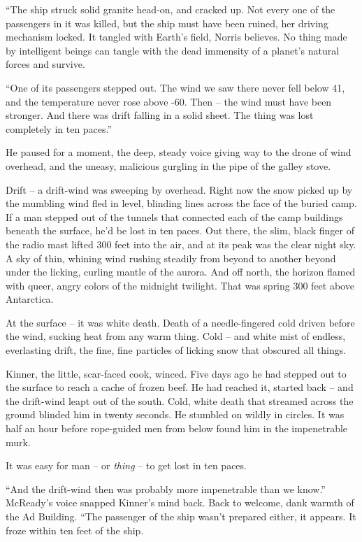 \documentclass[ebook,oneside,11pt]{memoir}				%
\begin{document}
``The ship struck solid granite head-on, and cracked up. Not every one of the passengers in it was killed, but the ship must have been ruined, her driving mechanism locked. It tangled with Earth's field, Norris believes. No thing made by intelligent beings can tangle with the dead immensity of a planet's natural forces and survive.

``One of its passengers stepped out. The wind we saw there never fell below 41, and the temperature never rose above -60. Then -- the wind must have been stronger. And there was drift falling in a solid sheet. The thing was lost completely in ten paces.''

He paused for a moment, the deep, steady voice giving way to the drone of wind overhead, and the uneasy, malicious gurgling in the pipe of the galley stove.

Drift -- a drift-wind was sweeping by overhead. Right now the snow picked up by the mumbling wind fled in level, blinding lines across the face of the buried camp. If a man stepped out of the tunnels that connected each of the camp buildings beneath the surface, he'd be lost in ten paces. Out there, the slim, black finger of the radio mast lifted 300 feet into the air, and at its peak was the clear night sky. A sky of thin, whining wind rushing steadily from beyond to another beyond under the licking, curling mantle of the aurora. And off north, the horizon flamed with queer, angry colors of the midnight twilight. That was spring 300 feet above Antarctica.

At the surface -- it was white death. Death of a needle-fingered cold driven before the wind, sucking heat from any warm thing. Cold -- and white mist of endless, everlasting drift, the fine, fine particles of licking snow that obscured all things.

Kinner, the little, scar-faced cook, winced. Five days ago he had stepped out to the surface to reach a cache of frozen beef. He had reached it, started back -- and the drift-wind leapt out of the south. Cold, white death that streamed across the ground blinded him in twenty seconds. He stumbled on wildly in circles. It was half an hour before rope-guided men from below found him in the impenetrable murk.

It was easy for man -- or \emph{thing} -- to get lost in ten paces.

``And the drift-wind then was probably more impenetrable than we know.'' McReady's voice snapped Kinner's mind back. Back to welcome, dank warmth of the Ad Building. ``The passenger of the ship wasn't prepared either, it appears. It froze within ten feet of the ship.
\end{document}
